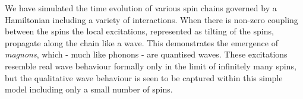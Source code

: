 
We have simulated the time evolution of various spin chains governed by a Hamiltonian including a variety of interactions. When there is non-zero coupling between the spins the local excitations, represented as tilting of the spins, propagate along the chain like a wave. This demonstrates the emergence of \textit{magnons}, which - much like phonons - are quantised waves. These excitations resemble real wave behaviour formally only in the limit of infinitely many spins, but the qualitative wave behaviour is seen to be captured within this simple model including only a small number of spins.